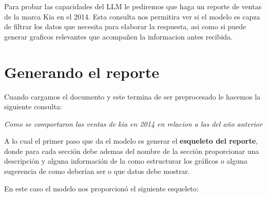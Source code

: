 Para probar las capacidades del LLM le pediremos que haga un reporte de ventas de la marca Kia en el 2014. Esta consulta nos permitira ver si el modelo es capza de filtrar los datos que necesita para elaborar la respuesta, asi como si puede generar graficos relevantes que acompañen la informacion antes recibida.

\section{Generando el reporte}
Cuando cargamos el documento y este termina de ser preprocesado le hacemos la siguiente consulta:

\textit{Como se comportaron las ventas de kia en 2014 en relacion a las del año anterior}

A lo cual el primer paso que da el modelo es generar el \textbf{esqueleto del reporte}, donde para cada sección debe ademas del nombre de la sección proporcionar una descripción y alguna información de la como estructurar los gráficos o alguna sugerencia de como deberían ser o que datos debe mostrar.

En este caso el modelo nos proporcionó el siguiente esqueleto:


